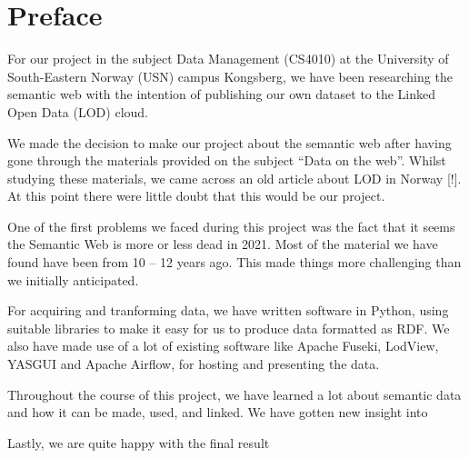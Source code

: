 \chapter*{Preface}

For our project in the subject Data Management (CS4010) at the University of South-Eastern Norway (USN) campus Kongsberg, we have been researching the semantic web with the intention of publishing our own dataset to the Linked Open Data (LOD) cloud.

\vspace{5mm}


We made the decision to make our project about the semantic web after having gone through the materials provided on the subject “Data on the web”. Whilst studying these materials, we came across an old article about LOD in Norway [!]. At this point there were little doubt that this would be our project.

\vspace{5mm}

One of the first problems we faced during this project was the fact that it seems the Semantic Web is more or less dead in 2021. Most of the material we have found have been from 10 – 12 years ago. This made things more challenging than we initially anticipated. 

\vspace{5mm}

For acquiring and tranforming data, we have written software in Python, using suitable libraries to make it easy for us to produce data formatted as RDF. We also have made use of a lot of existing software like Apache Fuseki, LodView, YASGUI and Apache Airflow, for hosting and presenting the data.

\vspace{5mm}

Throughout the course of this project, we have learned a lot about semantic data and how it can be made, used, and linked. We have gotten new insight into 

\vspace{5mm}

Lastly, we are quite happy with the final result



